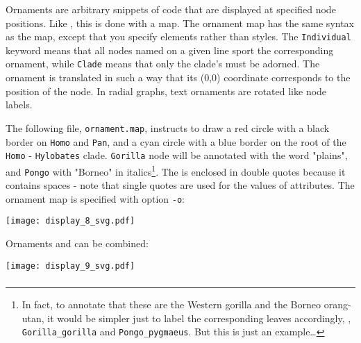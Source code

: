 Ornaments are arbitrary snippets of \svg{} code that are displayed at specified
node positions. Like \css, this is done with a map. The ornament map has the
same syntax as the \css{} map, except that you specify \svg{} elements rather
than \css{} styles. The \texttt{Individual} keyword means that all nodes named
on a given line sport the corresponding ornament, while \texttt{Clade} means
that only the clade's \lca{} must be adorned. The ornament is translated in
such a way that its (0,0) coordinate corresponds to the position of the node.
In radial graphs, text ornaments are rotated like node labels.

The following file, \texttt{ornament.map}, instructs to draw a red circle with
a black border on \texttt{Homo} and \texttt{Pan}, and a cyan circle with a blue
border on the root of the \texttt{Homo} - \texttt{Hylobates} clade.
\texttt{Gorilla} node will be annotated with the word "plains", and
\texttt{Pongo} with "Borneo" in italics\footnote{In fact, to annotate that these
are the Western gorilla and the Borneo orang-utan, it would be simpler just to
label the corresponding leaves accordingly, \ie, \texttt{Gorilla\_gorilla} and
\texttt{Pongo\_pygmaeus}. But this is just an example\ldots}. The \svg{}
is enclosed in double quotes because it contains spaces - note that single
quotes are used for the values of \xml{} attributes. The ornament map is
specified with option \texttt{-o}:
\begin{quote}
 
\end{quote}

\begin{center}
 \texttt{[image: display\_8\_svg.pdf]}
\end{center}

\noindent{}Ornaments and \css{} can be combined:


\begin{center}
 \texttt{[image: display\_9\_svg.pdf]}
\end{center}

\subsubsection{\libxml}

